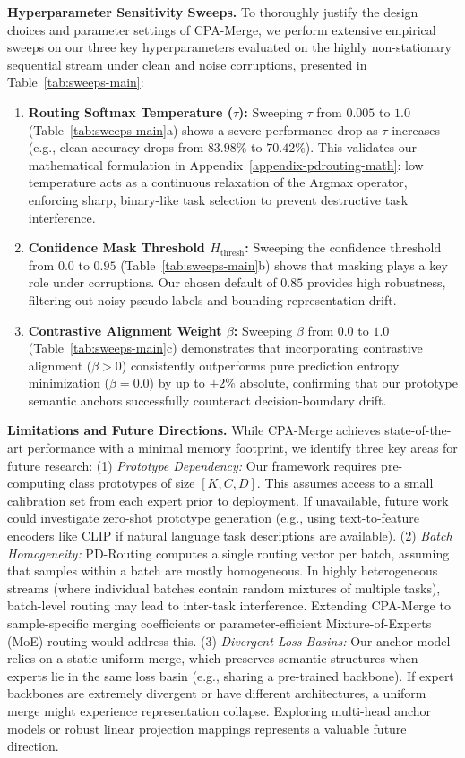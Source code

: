 \documentclass{article}
\theoremstyle{plain}
\theoremstyle{definition}
\theoremstyle{remark}
\begin{document}
\textbf{Hyperparameter Sensitivity Sweeps.} To thoroughly justify the design choices and parameter settings of CPA-Merge, we perform extensive empirical sweeps on our three key hyperparameters evaluated on the highly non-stationary sequential stream under clean and noise corruptions, presented in Table~\ref{tab:sweeps-main}:
\begin{enumerate}
    \item \textbf{Routing Softmax Temperature ($\tau$):} Sweeping $\tau$ from $0.005$ to $1.0$ (Table~\ref{tab:sweeps-main}a) shows a severe performance drop as $\tau$ increases (e.g., clean accuracy drops from $83.98\%$ to $70.42\%$). This validates our mathematical formulation in Appendix~\ref{appendix-pdrouting-math}: low temperature acts as a continuous relaxation of the Argmax operator, enforcing sharp, binary-like task selection to prevent destructive task interference.
    \item \textbf{Confidence Mask Threshold $H_{\text{thresh}}$:} Sweeping the confidence threshold from $0.0$ to $0.95$ (Table~\ref{tab:sweeps-main}b) shows that masking plays a key role under corruptions. Our chosen default of $0.85$ provides high robustness, filtering out noisy pseudo-labels and bounding representation drift.
    \item \textbf{Contrastive Alignment Weight $\beta$:} Sweeping $\beta$ from $0.0$ to $1.0$ (Table~\ref{tab:sweeps-main}c) demonstrates that incorporating contrastive alignment ($\beta > 0$) consistently outperforms pure prediction entropy minimization ($\beta = 0.0$) by up to $+2\%$ absolute, confirming that our prototype semantic anchors successfully counteract decision-boundary drift.
\end{enumerate}

\textbf{Limitations and Future Directions.} While CPA-Merge achieves state-of-the-art performance with a minimal memory footprint, we identify three key areas for future research: (1) \emph{Prototype Dependency:} Our framework requires pre-computing class prototypes of size $[K, C, D]$. This assumes access to a small calibration set from each expert prior to deployment. If unavailable, future work could investigate zero-shot prototype generation (e.g., using text-to-feature encoders like CLIP if natural language task descriptions are available). (2) \emph{Batch Homogeneity:} PD-Routing computes a single routing vector per batch, assuming that samples within a batch are mostly homogeneous. In highly heterogeneous streams (where individual batches contain random mixtures of multiple tasks), batch-level routing may lead to inter-task interference. Extending CPA-Merge to sample-specific merging coefficients or parameter-efficient Mixture-of-Experts (MoE) routing would address this. (3) \emph{Divergent Loss Basins:} Our anchor model relies on a static uniform merge, which preserves semantic structures when experts lie in the same loss basin (e.g., sharing a pre-trained backbone). If expert backbones are extremely divergent or have different architectures, a uniform merge might experience representation collapse. Exploring multi-head anchor models or robust linear projection mappings represents a valuable future direction.
\end{document}
